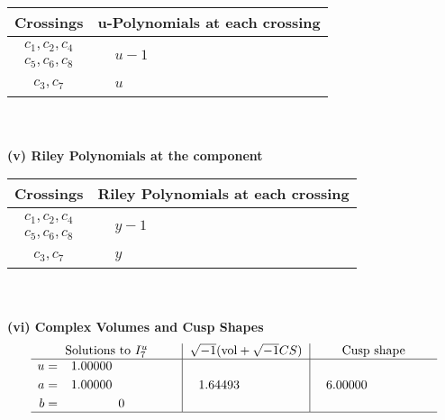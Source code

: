 \documentclass[1p]{elsarticle_modified}
\theoremstyle{definition}
\newcommand{\I}{\sqrt{-1}}
\begin{document}
\begin{tabular}{m{50pt}|m{274pt}}
Crossings & \hspace{64pt}u-Polynomials at each crossing \\
\hline $$\begin{aligned}c_{1},c_{2},c_{4}\\c_{5},c_{6},c_{8}\end{aligned}$$&$\begin{aligned}
&u-1
\end{aligned}$\\
\hline $$\begin{aligned}c_{3},c_{7}\end{aligned}$$&$\begin{aligned}
&u
\end{aligned}$\\
\hline
\end{tabular}\\~\\
\newpage\renewcommand{\arraystretch}{1}
\flushleft \textbf{(v) Riley Polynomials at the component}\newline \\
\begin{tabular}{m{50pt}|m{274pt}}
Crossings & \hspace{64pt}Riley Polynomials at each crossing \\
\hline $$\begin{aligned}c_{1},c_{2},c_{4}\\c_{5},c_{6},c_{8}\end{aligned}$$&$\begin{aligned}
&y-1
\end{aligned}$\\
\hline $$\begin{aligned}c_{3},c_{7}\end{aligned}$$&$\begin{aligned}
&y
\end{aligned}$\\
\hline
\end{tabular}\\~\\
\newpage\flushleft \textbf{(vi) Complex Volumes and Cusp Shapes}
$$\begin{array}{c|c|c}  
\text{Solutions to }I^u_{7}& \I (\text{vol} + \sqrt{-1}CS) & \text{Cusp shape}\\
 \hline 
\begin{aligned}
u &= \phantom{-}1.00000\phantom{ +0.000000I} \\
a &= \phantom{-}1.00000\phantom{ +0.000000I} \\
b &= \phantom{-0.000000 } 0\end{aligned}
 & \phantom{-}1.64493\phantom{ +0.000000I} & \phantom{-}6.00000\phantom{ +0.000000I}\\
 \hline 
 \end{array}$$\newpage\newpage\renewcommand{\arraystretch}{1}
\end{document}
